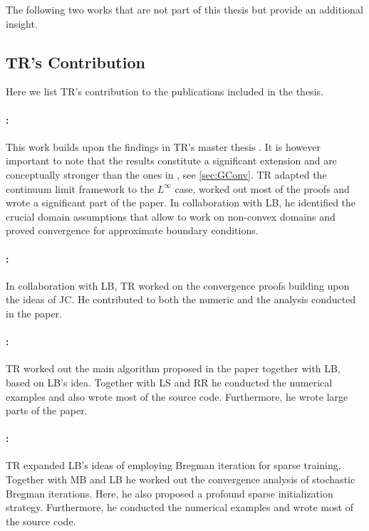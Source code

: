 \printbibliography[keyword={papersA}, resetnumbers=true, heading=none]
\printbibliography[keyword={papersB}, resetnumbers=true, heading=none]

The following two works that are not part of this thesis but provide an additional insight.

\printbibliography[keyword={papersC}, resetnumbers=true, heading=none]

\subsection*{TR's Contribution}

Here we list TR's contribution to the publications included in the thesis.

\paragraph{\cite{roith2022continuum}:} This work builds upon the findings in TR's master thesis \cite{roith2022msc}. It is however important to note that the results constitute a significant extension and are conceptually stronger than the ones in \cite{roith2022msc}, see \cref{sec:GConv}. TR adapted the continuum limit framework to the $L^\infty$ case, worked out most of the proofs and wrote a significant part of the paper. In collaboration with LB, he identified the crucial domain assumptions that allow to work on non-convex domains and proved convergence for approximate boundary conditions.

\paragraph{\cite{bungert2021uniform}:} In collaboration with LB, TR worked on the convergence proofs building upon the ideas of JC. He contributed to both the numeric and the analysis conducted in the paper.

\paragraph{\cite{bungert2021clip}:} TR worked out the main algorithm proposed in the paper together with LB, based on LB's idea. Together with LS and RR he conducted the numerical examples and also wrote most of the source code. Furthermore, he wrote large parts of the paper.

\paragraph{\cite{bungert2022bregman}:} TR expanded LB's ideas of employing Bregman iteration for sparse training. Together with MB and LB he worked out the convergence analysis of stochastic Bregman iterations. Here, he also proposed a profound sparse initialization strategy. Furthermore, he conducted the numerical examples and wrote most of the source code.


